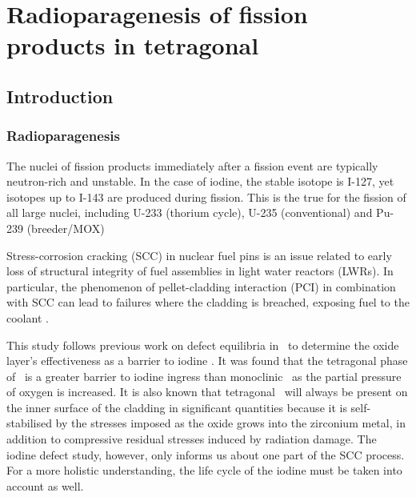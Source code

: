 \chapter{Radioparagenesis of fission products in tetragonal \zirconia}

\label{ch:results3}

\section{Introduction}
\subsection{Radioparagenesis}

The nuclei of fission products immediately after a fission event are typically neutron-rich and unstable. In the case of iodine, the stable isotope is I-127, yet isotopes up to I-143 are produced during fission. This is the true for the fission of all large nuclei, including U-233 (thorium cycle), U-235 (conventional) and Pu-239 (breeder/MOX)

Stress-corrosion cracking (SCC) in nuclear fuel pins is an issue related to early loss of structural integrity of fuel assemblies in light water reactors (LWRs). In particular, the phenomenon of pellet-cladding interaction (PCI) in combination with SCC can lead to failures where the cladding is breached, exposing fuel to the coolant \cite{bcoxpelletclad1990}.     

This study follows previous work on defect equilibria in \zirconia\ to determine the oxide layer's effectiveness as a barrier to iodine \cite{kenichiodine2018}. It was found that the tetragonal phase of \zirconia\ is a greater barrier to iodine ingress than monoclinic \zirconia\ as the partial pressure of oxygen is increased. It is also known that tetragonal \zirconia\ will always be present on the inner surface of the cladding in significant quantities because it is self-stabilised by the stresses imposed as the oxide grows into the zirconium metal, in addition to compressive residual stresses induced by radiation damage. The iodine defect study, however, only informs us about one part of the SCC process. For a more holistic understanding, the life cycle of the iodine must be taken into account as well.     



